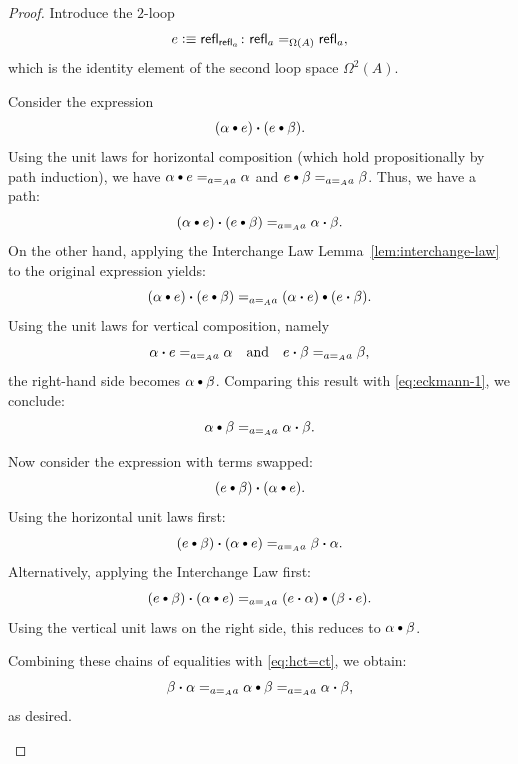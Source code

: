 \begin{proof}
    Introduce the $2$-loop
    \[
        e \defeq \fun{refl}_{\fun{refl}_a}
        \colon \fun{refl}_a \eq{\Omega(A)} \fun{refl}_a,
    \]
    which is the identity element of the second loop space $\Omega^2(A)$.
    
    \begin{description}[font=\normalfont\scshape]
        \item[Horizontal $=$ vertical:] Consider the expression
        \[
            (\alpha\hct e)\ct(e\hct\beta).
        \]
        Using the unit laws for horizontal composition (which hold propositionally by path induction), we have $\alpha\hct e \eq{a\eq Aa} \alpha$ and $e\hct\beta \eq{a\eq Aa} \beta$. Thus, we have a path:
        \begin{equation}\label{eq:eckmann-1}
            (\alpha\hct e)\ct(e\hct\beta) \eq{a\eq Aa} \alpha\ct\beta.
        \end{equation}
        On the other hand, applying the Interchange Law Lemma~\ref{lem:interchange-law} to the original expression yields:
        \[
            (\alpha\hct e)\ct(e\hct\beta) \eq{a\eq Aa} (\alpha\ct e)\hct(e\ct\beta).
        \]
        Using the unit laws for vertical composition, namely
        \[
            \alpha\mathbin{\boldsymbol{\cdot}} e \mathrel{=_{a\mathrel{=_{A}}a}} \alpha
            \quad\text{and}\quad
            e\mathbin{\boldsymbol{\cdot}}\beta \mathrel{=_{a\mathrel{=_{A}}a}} \beta,
        \]
        the right-hand side becomes $\alpha\hct\beta$. Comparing this result with \eqref{eq:eckmann-1}, we conclude:
        \begin{equation}\label{eq:hct=ct}
            \alpha\hct\beta\eq{a\eq Aa}\alpha\ct\beta.
        \end{equation}
        
        \item[Commutativity:] Now consider the expression with terms swapped:
        \[
            (e\hct\beta)\ct(\alpha\hct e).
        \]
        Using the horizontal unit laws first:
        \[
            (e\hct\beta)\ct(\alpha\hct e)
                \eq{a\eq Aa}\beta\ct\alpha.
        \]
        Alternatively, applying the Interchange Law first:
        \[
            (e\hct\beta)\ct(\alpha \hct e) 
                \eq{a\eq Aa}(e\ct\alpha)\hct(\beta\ct e).
        \]
        Using the vertical unit laws on the right side, this reduces to $\alpha\hct\beta$. 
        
        Combining these chains of equalities with \eqref{eq:hct=ct}, we obtain:
        \[
            \beta\ct\alpha
                \eq{a\eq Aa}\alpha\hct\beta
                \eq{a\eq Aa}\alpha\ct\beta,
        \]
        as desired.
    \end{description}
\end{proof}

